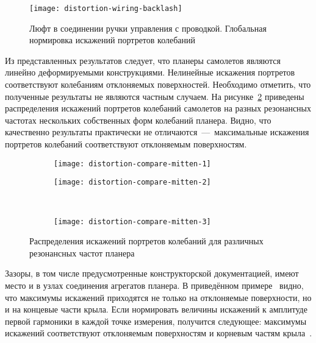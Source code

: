 \begin{figure}[!htb]
	\centerfloat
	\texttt{[image: distortion-wiring-backlash]}
	\caption{Люфт в соединении ручки управления с проводкой. Глобальная нормировка искажений портретов колебаний} \label{fig:distortion-wiring-backlash}
\end{figure}

Из представленных результатов следует, что планеры самолетов являются линейно деформируемыми конструкциями. Нелинейные искажения портретов соответствуют колебаниям отклоняемых поверхностей. Необходимо отметить, что полученные результаты не являются частным случаем. На рисунке~\ref{fig:distortion-compare-mitten} приведены распределения искажений портретов колебаний самолетов на разных резонансных частотах нескольких собственных форм колебаний планера. Видно, что качественно результаты практически не отличаются~---~максимальные искажения портретов колебаний соответствуют отклоняемым поверхностям.

\begin{figure}[!htb]
	\centerfloat
	\begin{subfigure}[t]{\sfDefects}
		\texttt{[image: distortion-compare-mitten-1]}
	\end{subfigure}
	\hfill
	\begin{subfigure}[t]{\sfDefects}
		\texttt{[image: distortion-compare-mitten-2]} 
	\end{subfigure} \\ 
	\begin{subfigure}[t]{\sfDefects}
		\vspace{-0.2cm}
		\texttt{[image: distortion-compare-mitten-3]} 
	\end{subfigure}
    \caption{Распределения искажений портретов колебаний для различных резонансных частот планера} \label{fig:distortion-compare-mitten}
\end{figure}

Зазоры, в том числе предусмотренные конструкторской документацией, имеют место и в узлах соединения агрегатов планера. В приведённом примере~ видно, что максимумы искажений приходятся не только на отклоняемые поверхности, но и на концевые части крыла. Если нормировать величины искажений к амплитуде первой гармоники в каждой точке измерения, получится следующее: максимумы искажений соответствуют отклоняемым поверхностям и корневым частям крыла~.

